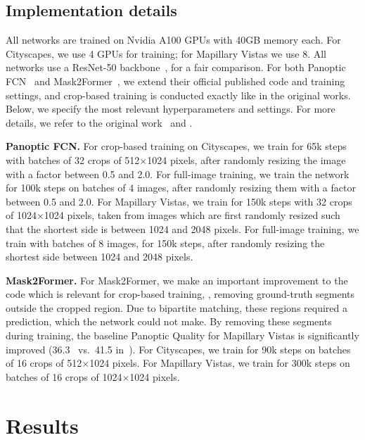 \documentclass[10pt,twocolumn,letterpaper]{article}
\begin{document}
\subsection{Implementation details}
\label{sec:experiments:impl_details}
All networks are trained on Nvidia A100 GPUs with 40GB memory each. For Cityscapes, we use 4 GPUs for training; for Mapillary Vistas we use 8. All networks use a ResNet-50 backbone~\cite{he2016resnet}, for a fair comparison. For both Panoptic FCN~\cite{li2021panopticfcn} and Mask2Former~\cite{cheng2021mask2former}, we extend their official published code and training settings, and crop-based training is conducted exactly like in the original works. Below, we specify the most relevant hyperparameters and settings. For more details, we refer to the original work~\cite{cheng2021mask2former,li2021panopticfcn} and .

\textbf{Panoptic FCN.} For crop-based training on Cityscapes, we train for 65k steps with batches of 32 crops of 512$\times$1024 pixels, after randomly resizing the image with a factor between 0.5 and 2.0. For full-image training, we train the network for 100k steps on batches of 4 images, after randomly resizing them with a factor between 0.5 and 2.0. For Mapillary Vistas, we train for 150k steps with 32 crops of 1024$\times$1024 pixels, taken from images which are first randomly resized such that the shortest side is between 1024 and 2048 pixels. For full-image training, we train with batches of 8 images, for 150k steps, after randomly resizing the shortest side between 1024 and 2048 pixels.

\textbf{Mask2Former.} For Mask2Former, we make an important improvement to the code which is relevant for crop-based training, \ie, removing ground-truth segments outside the cropped region. Due to bipartite matching, these regions required a prediction, which the network could not make. By removing these segments during training, the baseline Panoptic Quality for Mapillary Vistas is significantly improved (36.3~\cite{cheng2021mask2former} vs.~41.5 in~). For Cityscapes, we train for 90k steps on batches of 16 crops of 512$\times$1024 pixels. For Mapillary Vistas, we train for 300k steps on batches of 16 crops of 1024$\times$1024 pixels. 
 \section{Results}
\label{sec:results}
\end{document}
